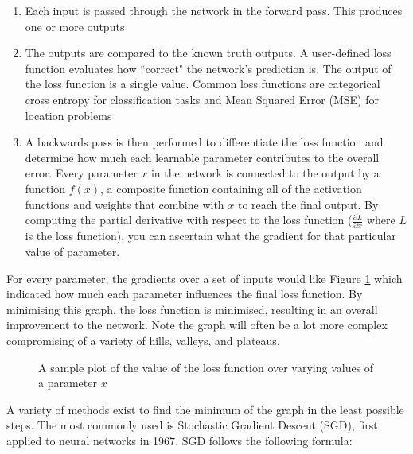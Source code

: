 \begin{enumerate}
    \item Each input is passed through the network in the forward pass. This produces one or more outputs
    \item The outputs are compared to the known truth outputs. A user-defined loss function evaluates how ``correct" the network's prediction is. The output of the loss function is a single value. Common loss functions are categorical cross entropy for classification tasks and Mean Squared Error (MSE) for location problems\cite{begmann-backpropagation}
    \item A backwards pass is then performed to differentiate the loss function and determine how much each learnable parameter contributes to the overall error. Every parameter $x$ in the network is connected to the output by a function $f(x)$, a composite function containing all of the activation functions and weights that combine with $x$ to reach the final output. By computing the partial derivative with respect to the loss function ($\frac{\partial L}{\partial x}$ where $L$ is the loss function), you can ascertain what the gradient for that particular value of parameter.
\end{enumerate}

For every parameter, the gradients over a set of inputs would like Figure \ref{fig:loss-graph} which indicated how much each parameter influences the final loss function. By minimising this graph, the loss function is minimised, resulting in an overall improvement to the network. Note the graph will often be a lot more complex compromising of a variety of hills, valleys, and plateaus.

\begin{figure}[H]
    \centering
    \caption{A sample plot of the value of the loss function over varying values of a parameter $x$}
    \label{fig:loss-graph}
\end{figure}

A variety of methods exist to find the minimum of the graph in the least possible steps. The most commonly used is Stochastic Gradient Descent (SGD)\cite{robbins1951stochastic}, first applied to neural networks in 1967\cite{shunichi1967theory}. SGD follows the following formula:

